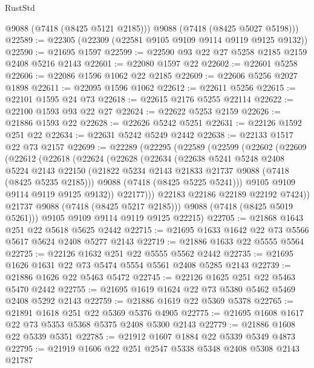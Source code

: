 \begin{lexlean}{RustStd}
\begin{coremodule}
        @9088
        (@7418 (@8425 @5121 @2185)))
      @9088
      (@7418 (@8425 @5027 @5198)))
@22589 := @22305 (@22309 (@22581 @9105 @9109 @9114 @9119 @9125 @9132))
@22590 := @21695 @1597
@22599 := @22590 @93 @22 @27 @5258 @2185 @2159 @2408 @5216 @2143
@22601 := @22080 @1597 @22
@22602 := @22601 @5258
@22606 := @22086 @1596 @1062 @22 @2185
@22609 := @22606 @5256 @2027 @1898
@22611 := @22095 @1596 @1062
@22612 := @22611 @5256
@22615 := @22101 @1595 @24 @73
@22618 := @22615 @2176 @5255 @22114
@22622 := @22100 @1593 @93 @22 @27
@22624 := @22622 @5253 @2159
@22626 := @21886 @1593 @22
@22628 := @22626 @5242 @5251
@22631 := @22126 @1592 @251 @22
@22634 := @22631 @5242 @5249 @2442
@22638 := @22133 @1517 @22 @73 @2157
@22699 := @22289
    (@22295
      (@22589
        (@22599
          (@22602
            (@22609
              (@22612
                (@22618
                  (@22624
                    (@22628
                      (@22634
                        (@22638
                          @5241
                          @5248
                          @2408
                          @5224
                          @2143
                          @22150
                          (@21822 @5234 @2143 @21833 @21737 @9088 (@7418 (@8425 @5235 @2185)))
                          @9088
                          (@7418 (@8425 @5225 @5241)))
                        @9105
                        @9109
                        @9114
                        @9119
                        @9125
                        @9132))
                    @22177)))
              @22183
              @22186
              @22189
              @22192
              @7424))
          @21737
          @9088
          (@7418 (@8425 @5217 @2185)))
        @9088
        (@7418 (@8425 @5019 @5261)))
      @9105
      @9109
      @9114
      @9119
      @9125
      @22215)
@22705 := @21868 @1643 @251 @22 @5618 @5625 @2442
@22715 := @21695 @1633 @1642 @22 @73 @5566 @5617 @5624 @2408 @5277 @2143
@22719 := @21886 @1633 @22 @5555 @5564
@22725 := @22126 @1632 @251 @22 @5555 @5562 @2442
@22735 := @21695 @1626 @1631 @22 @73 @5474 @5554 @5561 @2408 @5285 @2143
@22739 := @21886 @1626 @22 @5463 @5472
@22745 := @22126 @1625 @251 @22 @5463 @5470 @2442
@22755 := @21695 @1619 @1624 @22 @73 @5380 @5462 @5469 @2408 @5292 @2143
@22759 := @21886 @1619 @22 @5369 @5378
@22765 := @21891 @1618 @251 @22 @5369 @5376 @4905
@22775 := @21695 @1608 @1617 @22 @73 @5353 @5368 @5375 @2408 @5300 @2143
@22779 := @21886 @1608 @22 @5339 @5351
@22785 := @21912 @1607 @1884 @22 @5339 @5349 @4873
@22795 := @21919 @1606 @22 @251 @2547 @5338 @5348 @2408 @5308 @2143 @21787

\end{coremodule}
\end{lexlean}
